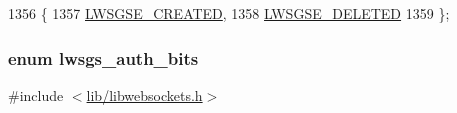 \begin{DoxyCode}
1356                   \{
1357         \hyperlink{group__generic-sessions_ggaa93946b3d921072209d5cd8cdfa5332ea596010a165bf13473c5eea3a34cd4308}{LWSGSE\_CREATED}, 
1358         \hyperlink{group__generic-sessions_ggaa93946b3d921072209d5cd8cdfa5332ead908cdc5689c5d22c9d3c8934e94dcde}{LWSGSE\_DELETED}  
1359 \};
\end{DoxyCode}
\subsubsection[{\texorpdfstring{lwsgs\+\_\+auth\+\_\+bits}{lwsgs\_auth\_bits}}]{\setlength{\rightskip}{0pt plus 5cm}enum {\bf lwsgs\+\_\+auth\+\_\+bits}}\hypertarget{group__generic-sessions_ga7c2dc7bfb4ccb91c5d771f9e9ea237e1}{}\label{group__generic-sessions_ga7c2dc7bfb4ccb91c5d771f9e9ea237e1}


{\ttfamily \#include $<$\hyperlink{libwebsockets_8h}{lib/libwebsockets.\+h}$>$}

